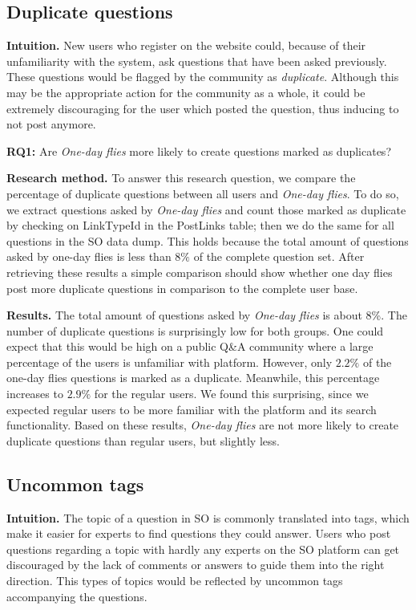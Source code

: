 \documentclass[conference]{IEEEtran}
\newcommand\odf{\emph{One-day flies}\xspace}
\begin{document}
\subsection{Duplicate questions}

\textbf{Intuition.} New users who register on
the website could, because of their unfamiliarity with the system, ask
questions that have been asked previously. These questions would be flagged
by the community as \textit{duplicate}. Although this may be the appropriate
action for the community as a whole, it could be extremely discouraging for the
user which posted the question, thus inducing to not post anymore. 

\textbf{RQ1:} Are \odf more likely to create questions marked as duplicates?

\textbf{Research method.} To answer this research question, we compare the
percentage of duplicate questions  between all users and \odf. To do so, we
extract questions asked by \odf and count those marked as duplicate by checking
on  LinkTypeId in the PostLinks table; then we do the same for all questions in
the SO data dump. This holds because the total amount of questions asked by
one-day flies is less than $8\%$ of the complete question set. After retrieving
these results a simple comparison should show whether one day flies post more
duplicate questions in comparison to the complete user base.

\textbf{Results.} The total amount of questions asked by \odf is about 8\%. The
number of duplicate questions is surprisingly low for both groups. One could
expect that this would be high on a public Q\&A community where a large
percentage of the users is unfamiliar with platform. However, only $2.2\%$ of
the one-day flies questions is marked as a duplicate. Meanwhile, this
percentage increases to $2.9\%$ for the regular users. We found this
surprising, since we expected regular users to be more familiar with the
platform and its search functionality. Based on these results, \odf are not
more likely to create duplicate questions than regular users, but slightly
less.


\subsection{Uncommon tags}

\textbf{Intuition.} The topic of a question in SO is commonly translated into
tags, which make it easier for experts to find questions they could answer.
Users who post questions regarding a topic with hardly any experts on the SO
platform can get discouraged by the lack of comments or answers to guide them
into the right direction. This types of topics would be reflected by uncommon
tags accompanying the questions. 
 
\end{document}
